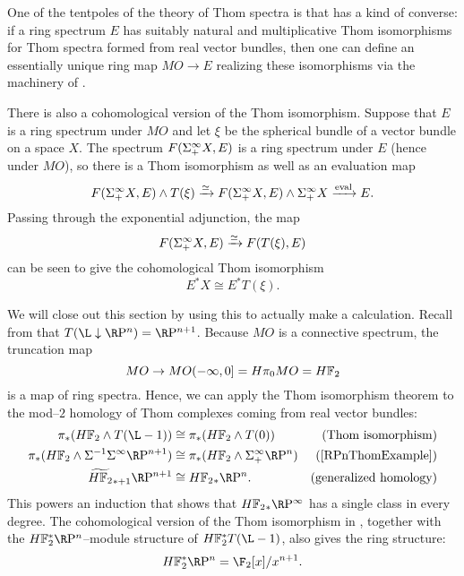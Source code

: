 \begin{remark}
One of the tentpoles of the theory of Thom spectra is that  has a kind of converse: if a ring spectrum $E$ has suitably natural and multiplicative Thom isomorphisms for Thom spectra formed from real vector bundles, then one can define an essentially unique ring map $MO \to E$ realizing these isomorphisms via the machinery of .
\end{remark}

\begin{remark}\label{CohomologicalThomIso}
There is also a cohomological version of the Thom isomorphism.  Suppose that $E$ is a ring spectrum under $MO$ and let $\xi$ be the spherical bundle of a vector bundle on a space $X$.  The spectrum $F(\Sigma^\infty_+ X, E)$ is a ring spectrum under $E$ (hence under $MO$), so there is a Thom isomorphism as well as an evaluation map \[F(\Sigma^\infty_+ X, E) \wedge T(\xi) \xrightarrow{\simeq} F(\Sigma^\infty_+ X, E) \wedge \Sigma^\infty_+ X \xrightarrow{\operatorname{eval}} E.\]  Passing through the exponential adjunction, the map \[F(\Sigma^\infty_+ X, E) \xrightarrow{\simeq} F(T(\xi), E)\] can be seen to give the cohomological Thom isomorphism \[E^* X \cong E^* T(\xi).\]
\end{remark}

\begin{example}\label{HF2RPinftyExample}
We will close out this section by using this to actually make a calculation. Recall from  that $T(\L \downarrow \RP^n) = \RP^{n+1}$.  Because $MO$ is a connective spectrum, the truncation map \[MO \to MO(-\infty, 0] = H\pi_0 MO = \HFtwo\] is a map of ring spectra.  Hence, we can apply the Thom isomorphism theorem to the mod--$2$ homology of Thom complexes coming from real vector bundles:
\begin{align*}
\pi_* (\HFtwo \sm T(\L - 1)) & \cong \pi_* (\HFtwo \sm T(0)) & \text{(Thom isomorphism)} \\
\pi_* (\HFtwo \sm \Susp^{-1} \Susp^\infty \RP^{n+1}) & \cong \pi_* (\HFtwo \sm \Susp^\infty_+ \RP^n) & \text{(\Cref{RPnThomExample})} \\
\widetilde{\HFtwo}_{*+1} \RP^{n+1} & \cong \HFtwo_* \RP^n. & \text{(generalized homology)}
\end{align*}
This powers an induction that shows that $\HFtwo_* \RP^\infty$ has a single class in every degree.  The cohomological version of the Thom isomorphism in , together with the $\HFtwo^* \RP^n$--module structure of $\HFtwo^* T(\L-1)$, also gives the ring structure: \[\HFtwo^* \RP^n = \F_2[x] / x^{n+1}.\]
\end{example}






